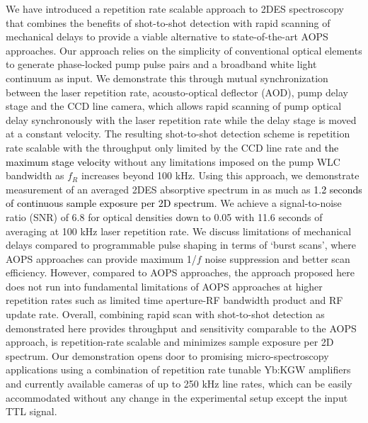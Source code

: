 \documentclass[%
aip,
amsmath,amssymb,
preprint,%
]{revtex4-2}
\newcommand*{\vt}[1]{\textcolor{black}{ #1}}
\begin{document}
We have introduced a repetition rate scalable approach to 2DES spectroscopy that combines the benefits of shot-to-shot detection with rapid scanning of mechanical delays to provide a viable alternative to state-of-the-art AOPS approaches.  Our approach relies on the simplicity of conventional optical elements to generate phase-locked pump pulse pairs and a broadband white light continuum as input. We demonstrate this through mutual synchronization between the laser repetition rate, acousto-optical deflector (AOD), pump delay stage and the CCD line camera, which allows rapid scanning of pump optical delay synchronously with the laser repetition rate while the delay stage is moved at a constant velocity. The resulting shot-to-shot detection scheme is repetition rate scalable with the throughput only limited by the CCD line rate and \vt{the maximum stage velocity} without any limitations imposed on the pump WLC bandwidth as $f_R$ increases beyond 100 kHz. Using this approach, we demonstrate measurement of an averaged 2DES absorptive spectrum in as much as \vt{1.2 seconds of continuous sample exposure per 2D spectrum}. We achieve a signal-to-noise ratio (SNR) of 6.8 for optical densities down to 0.05 with 11.6 seconds of averaging at 100 kHz laser repetition rate. We discuss limitations of mechanical delays compared to programmable pulse shaping in terms of `burst scans', where AOPS approaches can provide maximum 1/$f$ noise suppression and better scan efficiency. However, compared to AOPS approaches, the approach proposed here does not run into fundamental limitations of AOPS approaches at higher repetition rates such as limited time aperture-RF bandwidth product and RF update rate. Overall, combining rapid scan with shot-to-shot detection as demonstrated here provides throughput and sensitivity comparable to the AOPS approach, is repetition-rate scalable and minimizes sample exposure per 2D spectrum. Our demonstration opens door to promising micro-spectroscopy applications using a combination of repetition rate tunable Yb:KGW amplifiers and currently available cameras of up to 250 kHz line rates, which can be easily accommodated without any change in the experimental setup except the input TTL signal. 

%
%
\end{document}
